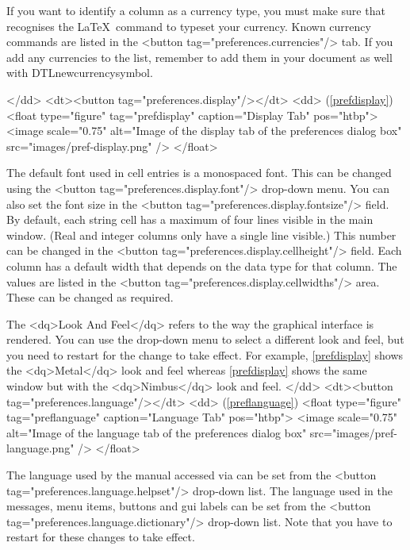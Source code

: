     If you want to identify a column as a currency type, you 
    must make sure that  recognises the \LaTeX\ command to typeset
    your currency. Known currency commands are listed in the 
    <button tag="preferences.currencies"/> tab. If you add any currencies
    to the list, remember to add them in your document as well with 
    \gls{DTLnewcurrencysymbol}.

    </dd>
    <dt><button tag="preferences.display"/></dt>
    <dd>
     (\autoref{prefdisplay})
     <float type="figure" tag="prefdisplay" caption="Display Tab" pos="htbp">
      <image scale="0.75" alt="Image of the display tab of the preferences dialog box" src="images/pref-display.png" />
     </float>

    The default font used in cell entries is a monospaced font. This can be
    changed using the <button tag="preferences.display.font"/> drop-down menu.
    You can also set the font size in the 
    <button tag="preferences.display.fontsize"/> field. By default, each
    string cell has a maximum of four lines visible in the main window.
    (Real and integer columns only have a single line visible.) This
    number can be changed in the <button tag="preferences.display.cellheight"/>
    field. Each column has a default width that depends on the data type
    for that column. The values are listed in the 
    <button tag="preferences.display.cellwidths"/> area. These can be changed
    as required.

The <dq>Look And Feel</dq> refers to the way the graphical interface
    is rendered. You can use the drop-down menu to
    select a different look and feel, but you need to restart  
    for the change to take effect. For example, \autoref{prefdisplay}
    shows the <dq>Metal</dq> look and feel whereas \autoref{prefdisplay}
    shows the same window but with the <dq>Nimbus</dq> look and feel.
    </dd>
    <dt><button tag="preferences.language"/></dt>
    <dd>
     (\autoref{preflanguage})
     <float type="figure" tag="preflanguage" caption="Language Tab" pos="htbp">
      <image scale="0.75" alt="Image of the language tab of the preferences dialog box" src="images/pref-language.png" />
     </float>

    The language used by the manual accessed via 
    can be set from the <button tag="preferences.language.helpset"/> drop-down 
    list. The language used in the messages, menu items, buttons and 
    \gls{gui} labels can be set from the 
    <button tag="preferences.language.dictionary"/> drop-down 
    list. Note that you have to restart  for these changes to take 
    effect.

